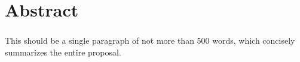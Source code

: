 \chapter*{Abstract} 
\subsection*{\thesistitle}

This should be a single paragraph of not more than 500 words, which concisely summarizes the entire proposal.